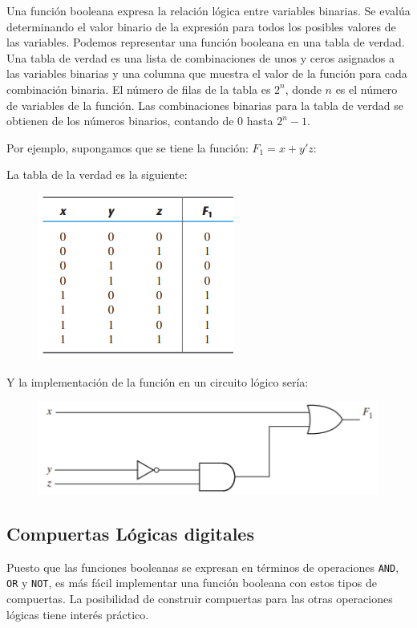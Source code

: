 \begin{mdframed}[backgroundcolor=gray!10,linewidth=0]
    Una función booleana expresa la relación lógica entre variables binarias. Se evalúa determinando el valor binario de la expresión para todos los posibles valores de las variables. Podemos representar una función booleana en una tabla de verdad. Una tabla de verdad es una lista de combinaciones de unos y ceros asignados a las variables binarias y una columna que muestra el valor de la función para cada combinación binaria. El número de filas de la tabla es $2^n$, donde $n$ es el número de variables de la función. Las combinaciones binarias para la tabla de verdad se obtienen de los números binarios, contando de $0$ hasta $2^n -1$. 
\end{mdframed}

\newpage
Por ejemplo, supongamos que se tiene la función: $F_1 = x + y'z$:

La tabla de la verdad es la siguiente:
\begin{figure}[h]
\centering
\includegraphics[scale=1]{img/tbvdd.png}
\end{figure}

Y la implementación de la función en un circuito lógico sería:
\begin{figure}[h]
\centering
\includegraphics[scale=0.9]{img/imple.png}
\end{figure}

\subsection{Compuertas Lógicas digitales}
Puesto que las funciones booleanas se expresan en términos de operaciones \texttt{AND}, \texttt{OR} y \texttt{NOT}, es más fácil implementar una función booleana con estos tipos de compuertas. La posibilidad de construir compuertas para las otras operaciones lógicas tiene interés práctico.

